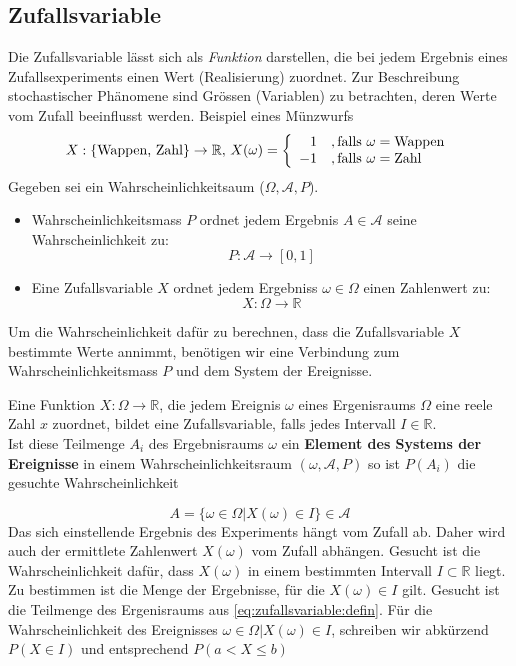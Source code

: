 \subsection{Zufallsvariable}
Die Zufallsvariable lässt sich als \textit{Funktion} darstellen, die bei jedem Ergebnis eines Zufallsexperiments einen Wert (Realisierung) zuordnet. Zur Beschreibung stochastischer Phänomene sind Grössen (Variablen) zu betrachten, deren Werte vom Zufall beeinflusst werden. Beispiel eines Münzwurfs
\begin{equation}
X: \{\mbox{Wappen, Zahl}\}\rightarrow \mathbb{R},\, X(\omega) = \left\{\begin{array}{r l}1&,  \mbox{falls }\omega=\mbox{Wappen}\\-1&, \mbox{falls }\omega=\mbox{Zahl}\end{array}\right.
\end{equation}
Gegeben sei ein Wahrscheinlichkeitsaum ($\Omega, \mathcal{A}, P$).
\begin{itemize}
	\item Wahrscheinlichkeitsmass $P$ ordnet jedem Ergebnis $A \in\mathcal{A}$ seine Wahrscheinlichkeit zu:
	\begin{equation}
	P: \mathcal{A}\rightarrow [0, 1]
	\end{equation}
	\item Eine Zufallsvariable $X$ ordnet jedem Ergebniss $\omega \in \Omega$ einen Zahlenwert zu:
	\begin{equation}
	X:\Omega \rightarrow \mathbb{R}
	\end{equation}
\end{itemize}
Um die Wahrscheinlichkeit dafür zu berechnen, dass die Zufallsvariable $X$ bestimmte Werte annimmt, benötigen wir eine Verbindung zum Wahrscheinlichkeitsmass $P$ und dem System der Ereignisse.
\begin{tcolorbox}[colback=green!5,colframe=green!40!black, title=Definition der Zufallsvariable]
Eine Funktion $X: \Omega \rightarrow \mathbb{R}$, die jedem Ereignis $\omega$ eines Ergenisraums $\Omega$ eine reele Zahl $x$ zuordnet, bildet eine Zufallsvariable, falls jedes Intervall $I\in \mathbb{R}$.\\
Ist diese Teilmenge $A_i$ des Ergebnisraums $\omega$ ein \textbf{Element des Systems der Ereignisse} in einem Wahrscheinlichkeitsraum $(\omega, \mathcal{A}, P)$ so ist $P(A_i)$ die gesuchte Wahrscheinlichkeit
\end{tcolorbox}
\begin{equation}\label{eq:zufallsvariable:defin}
A=\{\omega\in\Omega\vert X(\omega)\in I\}\in\mathcal{A}
\end{equation}
Das sich einstellende Ergebnis des Experiments hängt vom Zufall ab. Daher wird auch der ermittlete Zahlenwert $X(\omega)$ vom Zufall abhängen. Gesucht ist die Wahrscheinlichkeit dafür, dass $X(\omega)$ in einem bestimmten Intervall $I\subset \mathbb{R}$ liegt.\\
Zu bestimmen ist die Menge der Ergebnisse, für die $X(\omega)\in I$ gilt. Gesucht ist die Teilmenge des Ergenisraums aus \autoref{eq:zufallsvariable:defin}.
Für die Wahrscheinlichkeit des Ereignisses ${ \omega \in \Omega \vert X(\omega) \in I}$, schreiben wir abkürzend $P(X \in I)$ und entsprechend $P(a < X \leq b)$

